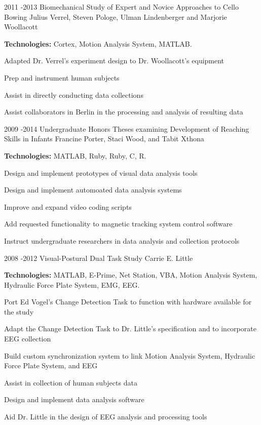 \documentclass[10pt]{article} %
\begin{document}
\project
{2011 -}{2013}
{Biomechanical Study of Expert and Novice Approaches to Cello Bowing}
{Julius Verrel, Steven Pologe, Ulman Lindenberger and Marjorie Woollacott}
{
\rule{0mm}{5mm}\textbf{Technologies:} Cortex, Motion Analysis System, MATLAB.

\begin{itemize-noindent}
\item{Adapted Dr. Verrel's experiment design to Dr. Woollacott's equipment}
\item{Prep and instrument human subjects}
\item{Assist in directly conducting data collections}
\item{Assist collaborators in Berlin in the processing and analysis of resulting data}
\end{itemize-noindent}

}


\project
{2009 -}{2014}
{Undergraduate Honors Theses examining Development of Reaching Skills in Infants}
{Francine Porter, Staci Wood, and Tabit Xthona}
{\rule{0mm}{5mm}\textbf{Technologies:} MATLAB, Ruby, Ruby, C, R.

\begin{itemize-noindent}
\item{Design and implement prototypes of visual data analysis tools}
\item{Design and implement automoated data analysis systems}
\item{Improve and expand video coding scripts}
\item{Add requested functionality to magnetic tracking system control software}
\item{Instruct undergraduate researchers in data analysis and collection protocols}
\end{itemize-noindent}

}


\project
{2008 -}{2012}
{Visual-Postural Dual Task Study}
{Carrie E. Little}
{\rule{0mm}{5mm}\textbf{Technologies:} MATLAB, E-Prime, Net Station, VBA, Motion Analysis System, Hydraulic Force Plate System, EMG, EEG.

\begin{itemize-noindent}
\item{Port Ed Vogel's Change Detection Task to function with hardware available for the study}
\item{Adapt the Change Detection Task to Dr. Little's specification and to incorporate EEG collection}
\item{Build custom synchronization system to link Motion Analysis System, Hydraulic Force Plate System, and EEG}
\item{Assist in collection of human subjects data}
\item{Design and implement data analysis software}
\item{Aid Dr. Little in the design of EEG analysis and processing tools}
\end{itemize-noindent}

}
\end{document}
